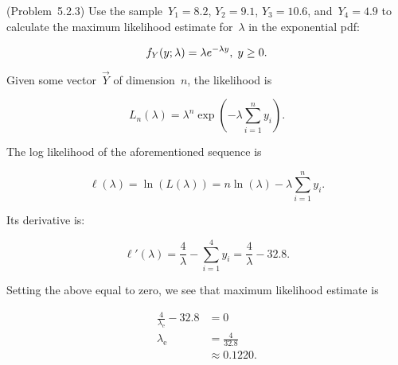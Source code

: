 \begin{problem}
  (\textnormal{Problem~5.2.3}) Use the sample~${Y_1 = 8.2}$, ${Y_2 = 9.1}$, ${Y_3 = 10.6}$, and~${Y_4 = 4.9}$ to calculate the maximum likelihood estimate for~$\lambda$ in the exponential pdf:

  \begin{equation}\label{eq:P02:Exponential}
    f_{Y}(y;\lambda) = \lambda e^{-\lambda y}, \hspace{0.1cm} y \geq 0 \text{.}
  \end{equation}
\end{problem}

Given some vector~$\vec{Y}$ of dimension~$n$, the likelihood is

\begin{equation}\label{eq:P02:Likelihood}
  L_{n}(\lambda) = \lambda^{n}\exp\left(-\lambda\sum_{i=1}^{n} y_{i}\right)\text{.}
\end{equation}

\noindent
The log likelihood of the aforementioned sequence is

\begin{equation}\label{eq:P02:LogLikelihood}
  \ell(\lambda) = \ln\left(L(\lambda)\right) = n\ln(\lambda) - \lambda \sum_{i=1}^{n} y_i\text{.}
\end{equation}

\noindent
Its derivative is:

\begin{equation}\label{eq:P02:LogLikelihood:Derivative}
  \ell'(\lambda) = \frac{4}{\lambda} - \sum_{i=1}^{4} y_i = \frac{4}{\lambda} - 32.8  \text{.}
\end{equation}

\noindent
Setting the above equal to zero, we see that maximum likelihood estimate is

\begin{align}
  \frac{4}{\lambda_{\text{e}}} - 32.8 &= 0 \\
  \lambda_{\text{e}} &= \frac{4}{32.8} \\
                     &\approx \boxed{0.1220} \text{.}
\end{align}
